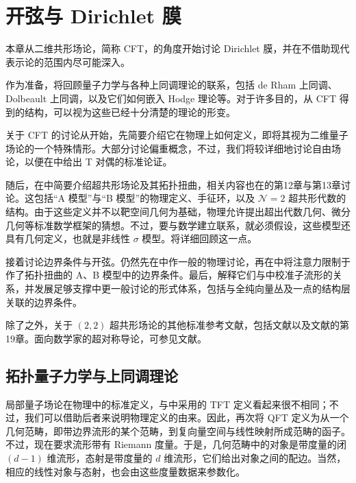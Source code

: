 \chapter{开弦与 Dirichlet 膜}\label{chap:3}

本章从二维共形场论，简称 CFT，的角度开始讨论 Dirichlet 膜，并在不借助现代表示论的范围内尽可能深入。

作为准备，将回顾量子力学与各种上同调理论的联系，包括 de Rham 上同调、Dolbeault 上同调，以及它们如何嵌入 Hodge 理论等。对于许多目的，从 CFT 得到的结构，可以视为这些已经十分清楚的理论的形变。

关于 CFT 的讨论从开始，先简要介绍它在物理上如何定义，即将其视为二维量子场论的一个特殊情形。大部分讨论偏重概念，不过，我们将较详细地讨论自由场论，以便在中给出 T 对偶的标准论证。

随后，在中简要介绍超共形场论及其拓扑扭曲，相关内容也在的第12章与第13章讨论。这包括“A 模型”与“B 模型”的物理定义、手征环，以及 $\mathcal{N}=2$ 超共形代数的结构。由于这些定义并不以靶空间几何为基础，物理允许提出超出代数几何、微分几何等标准数学框架的猜想。不过，要与数学建立联系，就必须假设，这些模型还具有几何定义，也就是非线性 $\sigma$ 模型。将详细回顾这一点。

接着讨论边界条件与开弦。仍然先在中作一般的物理讨论，再在中将注意力限制于作了拓扑扭曲的 A、B 模型中的边界条件。最后，解释它们与中校准子流形的关系，并发展足够支撑中更一般讨论的形式体系，包括与全纯向量丛及一点的结构层关联的边界条件。

除了之外，关于 $(2,2)$ 超共形场论的其他标准参考文献，包括文献以及文献的第19章。面向数学家的超对称导论，可参见文献。

\section{拓扑量子力学与上同调理论}\label{sec:3.1}

局部量子场论在物理中的标准定义，与中采用的 TFT 定义看起来很不相同；不过，我们可以借助后者来说明物理定义的由来。因此，再次将 QFT 定义为从一个几何范畴，即带边界流形的某个范畴，到复向量空间与线性映射所成范畴的函子。不过，现在要求流形带有 Riemann 度量。于是，几何范畴中的对象是带度量的闭 $(d-1)$ 维流形，态射是带度量的 $d$ 维流形，它们给出对象之间的配边。当然，相应的线性对象与态射，也会由这些度量数据来参数化。

